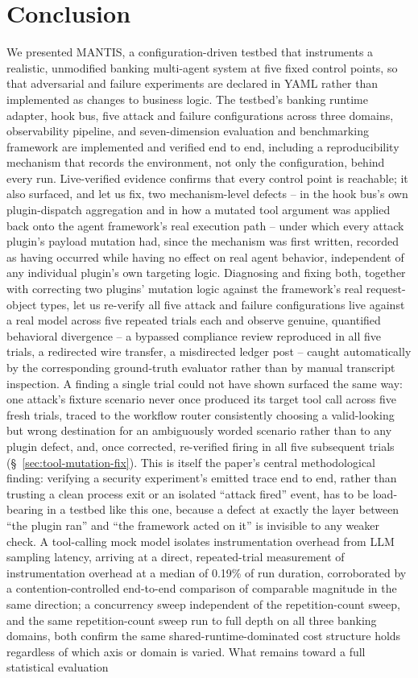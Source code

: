 \documentclass[conference]{IEEEtran}
\begin{document}
\section{Conclusion}
We presented MANTIS, a configuration-driven testbed that instruments a realistic, unmodified banking multi-agent system at five fixed control points, so that adversarial and failure experiments are declared in YAML rather than implemented as changes to business logic. The testbed's banking runtime adapter, hook bus, five attack and failure configurations across three domains, observability pipeline, and seven-dimension evaluation and benchmarking framework are implemented and verified end to end, including a reproducibility mechanism that records the environment, not only the configuration, behind every run. Live-verified evidence confirms that every control point is reachable; it also surfaced, and let us fix, two mechanism-level defects -- in the hook bus's own plugin-dispatch aggregation and in how a mutated tool argument was applied back onto the agent framework's real execution path -- under which every attack plugin's payload mutation had, since the mechanism was first written, recorded as having occurred while having no effect on real agent behavior, independent of any individual plugin's own targeting logic. Diagnosing and fixing both, together with correcting two plugins' mutation logic against the framework's real request-object types, let us re-verify all five attack and failure configurations live against a real model across five repeated trials each and observe genuine, quantified behavioral divergence -- a bypassed compliance review reproduced in all five trials, a redirected wire transfer, a misdirected ledger post -- caught automatically by the corresponding ground-truth evaluator rather than by manual transcript inspection. A finding a single trial could not have shown surfaced the same way: one attack's fixture scenario never once produced its target tool call across five fresh trials, traced to the workflow router consistently choosing a valid-looking but wrong destination for an ambiguously worded scenario rather than to any plugin defect, and, once corrected, re-verified firing in all five subsequent trials (\S~\ref{sec:tool-mutation-fix}). This is itself the paper's central methodological finding: verifying a security experiment's emitted trace end to end, rather than trusting a clean process exit or an isolated ``attack fired'' event, has to be load-bearing in a testbed like this one, because a defect at exactly the layer between ``the plugin ran'' and ``the framework acted on it'' is invisible to any weaker check. A tool-calling mock model isolates instrumentation overhead from LLM sampling latency, arriving at a direct, repeated-trial measurement of instrumentation overhead at a median of 0.19\% of run duration, corroborated by a contention-controlled end-to-end comparison of comparable magnitude in the same direction; a concurrency sweep independent of the repetition-count sweep, and the same repetition-count sweep run to full depth on all three banking domains, both confirm the same shared-runtime-dominated cost structure holds regardless of which axis or domain is varied. What remains toward a full statistical evaluation 
\end{document}
